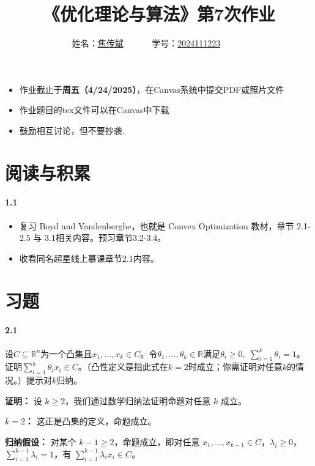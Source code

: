 \documentclass[12pt,a4paper]{article}
\begin{document}
\title{
{《优化理论与算法》第7次作业
}
}
\date{}

 \author{
 姓名：\underline{焦传斌}~~~~~~
 学号：\underline{2024111223}~~~~~~}

\maketitle
\begin{itemize}
	\item 作业截止于{\bf 周五（4/24/2025）}，在Canvas系统中提交PDF或照片文件
	\item 作业题目的tex文件可以在Canvas中下载
	\item 鼓励相互讨论，但不要抄袭.
\end{itemize}

\section{阅读与积累}
\paragraph{1.1}
\begin{itemize}
	\item 复习 Boyd and Vandenberghe，也就是 Convex Optimization 教材，章节 2.1-2.5 与 3.1相关内容。预习章节3.2-3.4。
\item 收看同名超星线上慕课章节2.1内容。
\end{itemize}

\section{习题}
\paragraph{2.1}
设$C\subseteq\mathbb{R}^n$为一个凸集且$x_1,...,x_k \in C$。令$\theta_1,...,\theta_k \in \mathbb{R}$满足$\theta_i \geq 0, \;\sum_{i=1}^k \theta_i=1$。证明$\sum_{i=1}^k\theta_i x_i\in C$。（凸性定义是指此式在$k=2$时成立；你需证明对任意$k$的情况。）提示对$k$归纳。

\textbf{证明：} 设 $k\ge2$，我们通过数学归纳法证明命题对任意 $k$ 成立。

\textbf{$k=2$：} 这正是凸集的定义，命题成立。

\textbf{归纳假设：} 对某个 $k-1 \ge 2$，命题成立，即对任意 $x_1,\dots,x_{k-1}\in C$，$\lambda_i\ge0$，$\sum_{i=1}^{k-1}\lambda_i=1$，有 $\sum_{i=1}^{k-1}\lambda_i x_i \in C$。
\end{document}
